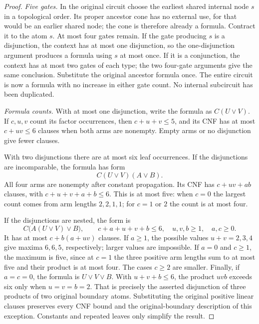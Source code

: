\documentclass[11pt]{article}
\theoremstyle{definition}
\theoremstyle{remark}
\begin{document}
\begin{proof}
\emph{Five gates.} In the original circuit choose the earliest shared internal node $s$ in a topological order. Its proper ancestor cone has no external use, for that would be an earlier shared node; the cone is therefore already a formula. Contract it to the atom $s$. At most four gates remain. If the gate producing $s$ is a disjunction, the context has at most one disjunction, so the one-disjunction argument produces a formula using $s$ at most once. If it is a conjunction, the context has at most two gates of each type; the two four-gate arguments give the same conclusion. Substitute the original ancestor formula once. The entire circuit is now a formula with no increase in either gate count. No internal subcircuit has been duplicated.

\emph{Formula counts.} With at most one disjunction, write the formula as $C(U\vee V)$. If $c,u,v$ count its factor occurrences, then $c+u+v\le5$, and its CNF has at most $c+uv\le6$ clauses when both arms are nonempty. Empty arms or no disjunction give fewer clauses.

With two disjunctions there are at most six leaf occurrences. If the disjunctions are incomparable, the formula has form
\[
C(U\vee V)(A\vee B).
\]
All four arms are nonempty after constant propagation. Its CNF has $c+uv+ab$ clauses, with $c+u+v+a+b\le6$. This is at most five: when $c=0$ the largest count comes from arm lengths $2,2,1,1$; for $c=1$ or $2$ the count is at most four.

If the disjunctions are nested, the form is
\[
C\bigl(A(U\vee V)\vee B\bigr),\qquad
c+a+u+v+b\le6,\quad u,v,b\ge1,\quad a,c\ge0.
\]
It has at most $c+b(a+uv)$ clauses. If $a\ge1$, the possible values $u+v=2,3,4$ give maxima $6,6,5$, respectively; larger values are impossible. If $a=0$ and $c\ge1$, the maximum is five, since at $c=1$ the three positive arm lengths sum to at most five and their product is at most four. The cases $c\ge2$ are smaller. Finally, if $a=c=0$, the formula is $U\vee V\vee B$. With $u+v+b\le6$, the product $uvb$ exceeds six only when $u=v=b=2$. That is precisely the asserted disjunction of three products of two original boundary atoms. Substituting the original positive linear clauses preserves every CNF bound and the original-boundary description of this exception. Constants and repeated leaves only simplify the result.
\end{proof}
\end{document}
